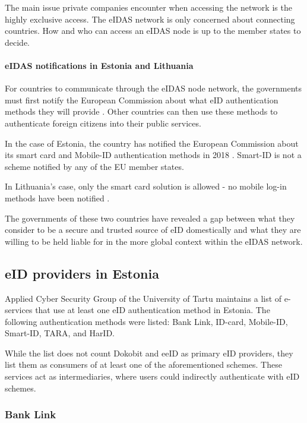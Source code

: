 The main issue private companies encounter when accessing the network is the highly exclusive access. The eIDAS network is only concerned about connecting countries. How and who can access an eIDAS node is up to the member states to decide.

\paragraph{eIDAS notifications in Estonia and Lithuania}

For countries to communicate through the eIDAS node network, the governments must first notify the European Commission about what eID authentication methods they will provide \cite{eulaw-eidas}. Other countries can then use these methods to authenticate foreign citizens into their public services.

In the case of Estonia, the country has notified the European Commission about its smart card and Mobile-ID authentication methods in 2018 \cite{eulaw-eidas-notified}. Smart-ID is not a scheme notified by any of the EU member states.

In Lithuania's case, only the smart card solution is allowed - no mobile log-in methods have been notified \cite{eulaw-eidas-notified}.

The governments of these two countries have revealed a gap between what they consider to be a secure and trusted source of eID domestically and what they are willing to be held liable for in the more global context within the eIDAS network.

\subsection{eID providers in Estonia}

Applied Cyber Security Group of the University of Tartu maintains a list of e-services \cite{ut-eidinestonia} that use at least one eID authentication method in Estonia. The following authentication methods were listed: Bank Link, ID-card, Mobile-ID, Smart-ID, TARA, and HarID.

While the list does not count Dokobit and eeID as primary eID providers, they list them as consumers of at least one of the aforementioned schemes. These services act as intermediaries, where users could indirectly authenticate with eID schemes.

\subsubsection{Bank Link}

